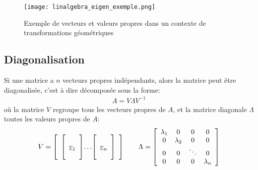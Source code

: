 \begin{figure}[H]
	\centering
		\texttt{[image: linalgebra\_eigen\_exemple.png]}
	\caption{Exemple de vecteurs et valeurs propres dans un contexte de transformations géométriques}
	\label{fig:linalgebra_eigen_exemple}
\end{figure}

\subsection{Diagonalisation}

Si une matrice a $n$ vecteurs propres indépendants, alors la matrice peut être diagonalisée, c'est à dire décomposée sous la forme:
\begin{align}
A = V \Lambda V^{-1}
\label{eq:diagmatrix}
\end{align}
où la matrice $V$ regroupe tous les vecteurs propres de $A$, et la matrice diagonale $\Lambda$ toutes les valeurs propres  de $A$:
\begin{align}
V = 
\left[ \begin{array}{c@{}c@{}c}  
\left[  \begin{array}{c}  \\ \underline{v}_1 \\ \\ \end{array} \right] &  \ldots & \left[  \begin{array}{c} \\ \underline{v}_n \\ \\ \end{array} \right]
\end{array} \right]
\quad \quad
\Lambda = 
\left[ \begin{array}{c c c c}  
\lambda_1 &  0          & 0 & 0 \\
0         &  \lambda_2  & 0      & 0 \\
0         &  0          &\ddots  & 0 \\
0         &  0          & 0  & \lambda_n
\end{array} \right]
\end{align}

